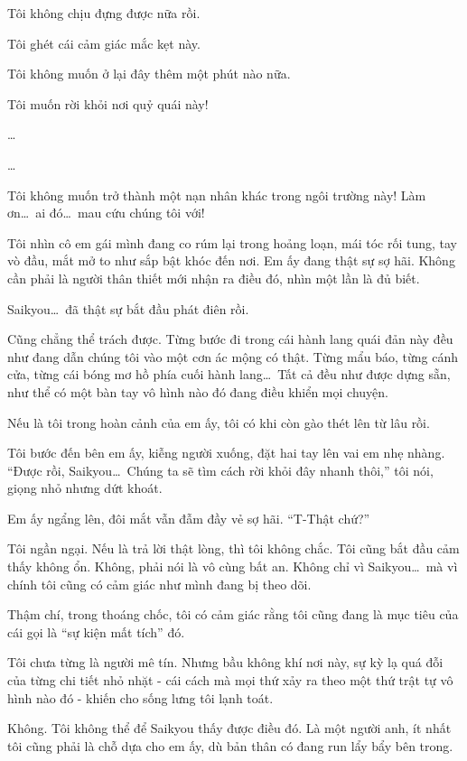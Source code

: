 \documentclass[../main.tex]{subfiles}
\begin{document}
Tôi không chịu đựng được nữa rồi.

Tôi ghét cái cảm giác mắc kẹt này.

Tôi không muốn ở lại đây thêm một phút nào nữa.

Tôi muốn rời khỏi nơi quỷ quái này!

\dots

\dots

Tôi không muốn trở thành một nạn nhân khác trong ngôi trường này! Làm ơn\dots\ ai đó\dots\ mau cứu chúng tôi với!


Tôi nhìn cô em gái mình đang co rúm lại trong hoảng loạn, mái tóc rối tung, tay vò đầu, mắt mở to như sắp bật khóc đến nơi. Em ấy đang thật sự sợ hãi. Không cần phải là người thân thiết mới nhận ra điều đó, nhìn một lần là đủ biết.

Saikyou\dots\ đã thật sự bắt đầu phát điên rồi.

Cũng chẳng thể trách được. Từng bước đi trong cái hành lang quái đản này đều như đang dẫn chúng tôi vào một cơn ác mộng có thật. Từng mẩu báo, từng cánh cửa, từng cái bóng mơ hồ phía cuối hành lang\dots\ Tất cả đều như được dựng sẵn, như thể có một bàn tay vô hình nào đó đang điều khiển mọi chuyện.

Nếu là tôi trong hoàn cảnh của em ấy, tôi có khi còn gào thét lên từ lâu rồi.

Tôi bước đến bên em ấy, kiễng người xuống, đặt hai tay lên vai em nhẹ nhàng. ``Được rồi, Saikyou\dots\ Chúng ta sẽ tìm cách rời khỏi đây nhanh thôi,'' tôi nói, giọng nhỏ nhưng dứt khoát.

Em ấy ngẩng lên, đôi mắt vẫn đẫm đầy vẻ sợ hãi. ``T-Thật chứ?''

Tôi ngần ngại. Nếu là trả lời thật lòng, thì tôi không chắc. Tôi cũng bắt đầu cảm thấy không ổn. Không, phải nói là vô cùng bất an. Không chỉ vì Saikyou\dots\ mà vì chính tôi cũng có cảm giác như mình đang bị theo dõi.

Thậm chí, trong thoáng chốc, tôi có cảm giác rằng tôi cũng đang là mục tiêu của cái gọi là ``sự kiện mất tích'' đó.

Tôi chưa từng là người mê tín. Nhưng bầu không khí nơi này, sự kỳ lạ quá đỗi của từng chi tiết nhỏ nhặt - cái cách mà mọi thứ xảy ra theo một thứ trật tự vô hình nào đó - khiến cho sống lưng tôi lạnh toát.

Không. Tôi không thể để Saikyou thấy được điều đó. Là một người anh, ít nhất tôi cũng phải là chỗ dựa cho em ấy, dù bản thân có đang run lẩy bẩy bên trong.
\end{document}
